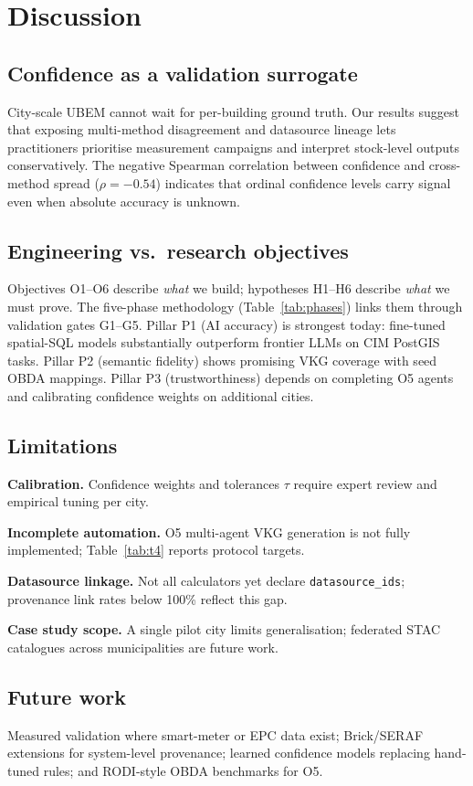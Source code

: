 \section{Discussion}
\label{sec:discussion}

\subsection{Confidence as a validation surrogate}

City-scale UBEM cannot wait for per-building ground truth.
Our results suggest that exposing multi-method disagreement and datasource lineage lets practitioners prioritise measurement campaigns and interpret stock-level outputs conservatively.
The negative Spearman correlation between confidence and cross-method spread ($\rho = -0.54$) indicates that ordinal confidence levels carry signal even when absolute accuracy is unknown.

\subsection{Engineering vs.\ research objectives}

Objectives O1--O6 describe \emph{what} we build; hypotheses H1--H6 describe \emph{what} we must prove.
The five-phase methodology (Table~\ref{tab:phases}) links them through validation gates G1--G5.
Pillar P1 (AI accuracy) is strongest today: fine-tuned spatial-SQL models substantially outperform frontier LLMs on CIM PostGIS tasks.
Pillar P2 (semantic fidelity) shows promising VKG coverage with seed OBDA mappings.
Pillar P3 (trustworthiness) depends on completing O5 agents and calibrating confidence weights on additional cities.

\subsection{Limitations}

\textbf{Calibration.}
Confidence weights and tolerances $\tau$ require expert review and empirical tuning per city.

\textbf{Incomplete automation.}
O5 multi-agent VKG generation is not fully implemented; Table~\ref{tab:t4} reports protocol targets.

\textbf{Datasource linkage.}
Not all calculators yet declare \texttt{datasource\_ids}; provenance link rates below 100\% reflect this gap.

\textbf{Case study scope.}
A single pilot city limits generalisation; federated STAC catalogues across municipalities are future work.

\subsection{Future work}

Measured validation where smart-meter or EPC data exist; Brick/SERAF extensions for system-level provenance; learned confidence models replacing hand-tuned rules; and RODI-style OBDA benchmarks for O5.
